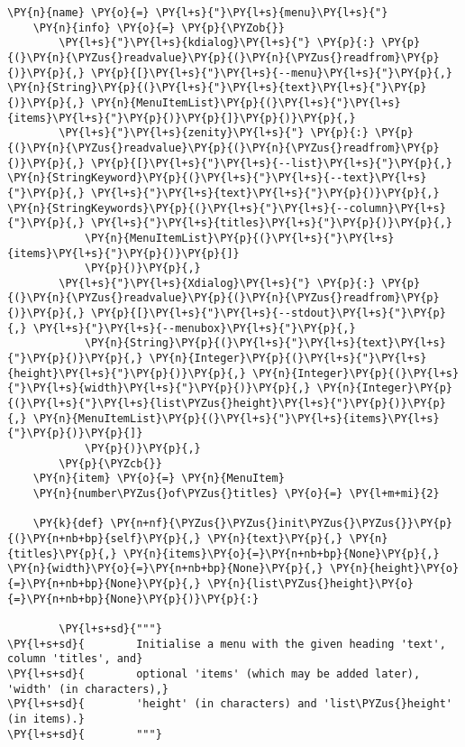 \begin{Verbatim}[commandchars=\\\{\}]
    \PY{n}{name} \PY{o}{=} \PY{l+s}{"}\PY{l+s}{menu}\PY{l+s}{"}
    \PY{n}{info} \PY{o}{=} \PY{p}{\PYZob{}}
        \PY{l+s}{"}\PY{l+s}{kdialog}\PY{l+s}{"} \PY{p}{:} \PY{p}{(}\PY{n}{\PYZus{}readvalue}\PY{p}{(}\PY{n}{\PYZus{}readfrom}\PY{p}{)}\PY{p}{,} \PY{p}{[}\PY{l+s}{"}\PY{l+s}{--menu}\PY{l+s}{"}\PY{p}{,} \PY{n}{String}\PY{p}{(}\PY{l+s}{"}\PY{l+s}{text}\PY{l+s}{"}\PY{p}{)}\PY{p}{,} \PY{n}{MenuItemList}\PY{p}{(}\PY{l+s}{"}\PY{l+s}{items}\PY{l+s}{"}\PY{p}{)}\PY{p}{]}\PY{p}{)}\PY{p}{,}
        \PY{l+s}{"}\PY{l+s}{zenity}\PY{l+s}{"} \PY{p}{:} \PY{p}{(}\PY{n}{\PYZus{}readvalue}\PY{p}{(}\PY{n}{\PYZus{}readfrom}\PY{p}{)}\PY{p}{,} \PY{p}{[}\PY{l+s}{"}\PY{l+s}{--list}\PY{l+s}{"}\PY{p}{,} \PY{n}{StringKeyword}\PY{p}{(}\PY{l+s}{"}\PY{l+s}{--text}\PY{l+s}{"}\PY{p}{,} \PY{l+s}{"}\PY{l+s}{text}\PY{l+s}{"}\PY{p}{)}\PY{p}{,} \PY{n}{StringKeywords}\PY{p}{(}\PY{l+s}{"}\PY{l+s}{--column}\PY{l+s}{"}\PY{p}{,} \PY{l+s}{"}\PY{l+s}{titles}\PY{l+s}{"}\PY{p}{)}\PY{p}{,}
            \PY{n}{MenuItemList}\PY{p}{(}\PY{l+s}{"}\PY{l+s}{items}\PY{l+s}{"}\PY{p}{)}\PY{p}{]}
            \PY{p}{)}\PY{p}{,}
        \PY{l+s}{"}\PY{l+s}{Xdialog}\PY{l+s}{"} \PY{p}{:} \PY{p}{(}\PY{n}{\PYZus{}readvalue}\PY{p}{(}\PY{n}{\PYZus{}readfrom}\PY{p}{)}\PY{p}{,} \PY{p}{[}\PY{l+s}{"}\PY{l+s}{--stdout}\PY{l+s}{"}\PY{p}{,} \PY{l+s}{"}\PY{l+s}{--menubox}\PY{l+s}{"}\PY{p}{,}
            \PY{n}{String}\PY{p}{(}\PY{l+s}{"}\PY{l+s}{text}\PY{l+s}{"}\PY{p}{)}\PY{p}{,} \PY{n}{Integer}\PY{p}{(}\PY{l+s}{"}\PY{l+s}{height}\PY{l+s}{"}\PY{p}{)}\PY{p}{,} \PY{n}{Integer}\PY{p}{(}\PY{l+s}{"}\PY{l+s}{width}\PY{l+s}{"}\PY{p}{)}\PY{p}{,} \PY{n}{Integer}\PY{p}{(}\PY{l+s}{"}\PY{l+s}{list\PYZus{}height}\PY{l+s}{"}\PY{p}{)}\PY{p}{,} \PY{n}{MenuItemList}\PY{p}{(}\PY{l+s}{"}\PY{l+s}{items}\PY{l+s}{"}\PY{p}{)}\PY{p}{]}
            \PY{p}{)}\PY{p}{,}
        \PY{p}{\PYZcb{}}
    \PY{n}{item} \PY{o}{=} \PY{n}{MenuItem}
    \PY{n}{number\PYZus{}of\PYZus{}titles} \PY{o}{=} \PY{l+m+mi}{2}

    \PY{k}{def} \PY{n+nf}{\PYZus{}\PYZus{}init\PYZus{}\PYZus{}}\PY{p}{(}\PY{n+nb+bp}{self}\PY{p}{,} \PY{n}{text}\PY{p}{,} \PY{n}{titles}\PY{p}{,} \PY{n}{items}\PY{o}{=}\PY{n+nb+bp}{None}\PY{p}{,} \PY{n}{width}\PY{o}{=}\PY{n+nb+bp}{None}\PY{p}{,} \PY{n}{height}\PY{o}{=}\PY{n+nb+bp}{None}\PY{p}{,} \PY{n}{list\PYZus{}height}\PY{o}{=}\PY{n+nb+bp}{None}\PY{p}{)}\PY{p}{:}

        \PY{l+s+sd}{"""}
\PY{l+s+sd}{        Initialise a menu with the given heading 'text', column 'titles', and}
\PY{l+s+sd}{        optional 'items' (which may be added later), 'width' (in characters),}
\PY{l+s+sd}{        'height' (in characters) and 'list\PYZus{}height' (in items).}
\PY{l+s+sd}{        """}


\end{Verbatim}

